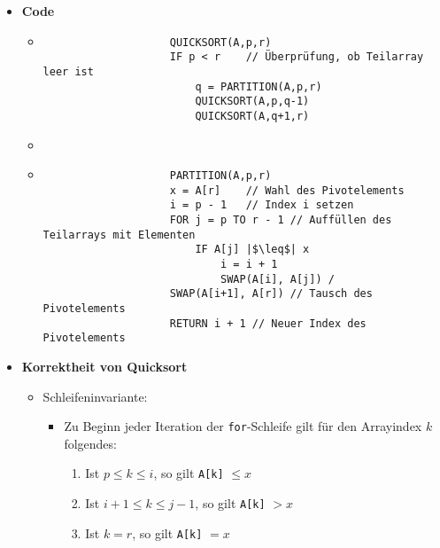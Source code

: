 \begin{itemize}
        \item \textbf{Code}
            \begin{itemize}
                \item[]
                    \begin{verbatim}
                    QUICKSORT(A,p,r)
                    IF p < r    // Überprüfung, ob Teilarray leer ist
                        q = PARTITION(A,p,r)
                        QUICKSORT(A,p,q-1)
                        QUICKSORT(A,q+1,r)
                    \end{verbatim}
                \item[]
                \item[]
                    \begin{verbatim}
                    PARTITION(A,p,r)
                    x = A[r]    // Wahl des Pivotelements
                    i = p - 1   // Index i setzen
                    FOR j = p TO r - 1 // Auffüllen des Teilarrays mit Elementen
                        IF A[j] |$\leq$| x
                            i = i + 1
                            SWAP(A[i], A[j]) /
                    SWAP(A[i+1], A[r]) // Tausch des Pivotelements
                    RETURN i + 1 // Neuer Index des Pivotelements
                    \end{verbatim}
            \end{itemize}

        \item \textbf{Korrektheit von Quicksort}
            \begin{itemize}
                \item Schleifeninvariante:
                    \begin{itemize}
                        \item[]
                            Zu Beginn jeder Iteration der \texttt{for}-Schleife gilt für den Arrayindex $k$ folgendes:
                            \begin{enumerate}
                                \item Ist $p \leq k \leq i$, so gilt \texttt{A[k]} $\leq x$
                                \item Ist $i+1 \leq k \leq j -1$, so gilt \texttt{A[k]} $> x$
                                \item Ist $k = r$, so gilt \texttt{A[k]} $= x$ 
                            \end{enumerate}
                    \end{itemize}  
                

\end{itemize}
\end{itemize}
